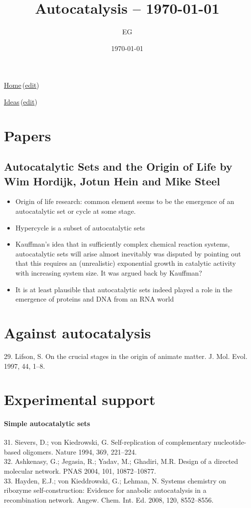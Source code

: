 \documentclass[12pt]{paper}
\title{Autocatalysis -- \today}
\author{EG}
\date{\today}
\newcommand{\wikilink}[2] { \href{#1.pdf}{#2}\,(\href{#1.tex}{edit})}
\begin{document}
 \maketitle
\wikilink{home}{Home}

\wikilink{ideas}{Ideas}
 
\section{Papers}
\subsection{Autocatalytic Sets and the Origin of Life by
Wim Hordijk, Jotun Hein and Mike Steel\cite{Hordijk2010}}

\begin{itemize}
 \item  Origin of life research: common element seems to be the emergence of an autocatalytic set 
or cycle at some stage. 
\item Hypercycle is a subset of autocatalytic sets

\item Kauffman's idea that in  sufficiently complex chemical reaction systems, autocatalytic
sets will arise almost inevitably was disputed by pointing out that this requires an
(unrealistic) exponential growth in catalytic activity with increasing system size. It was argued 
back by Kauffman?

\item It is at least plausible that autocatalytic sets indeed
played a role in the emergence of proteins and DNA from an RNA world
\end{itemize}

\section{Against autocatalysis}
29.
 Lifson, S. On the crucial stages in the origin of animate matter. J. Mol. Evol. 1997, 44, 1–8.

\section{Experimental support}

\paragraph{Simple autocatalytic sets}
31.
 Sievers, D.; von Kiedrowski, G. Self-replication of complementary nucleotide-based oligomers.
Nature 1994, 369, 221–224.\\
32.
 Ashkenasy, G.; Jegasia, R.; Yadav, M.; Ghadiri, M.R. Design of a directed molecular network.
PNAS 2004, 101, 10872–10877.\\
33.
 Hayden, E.J.; von Kieddrowski, G.; Lehman, N. Systems chemistry on ribozyme self-construction:
Evidence for anabolic autocatalysis in a recombination network. Angew. Chem. Int. Ed. 2008,
120, 8552–8556.











   
\end{document}
